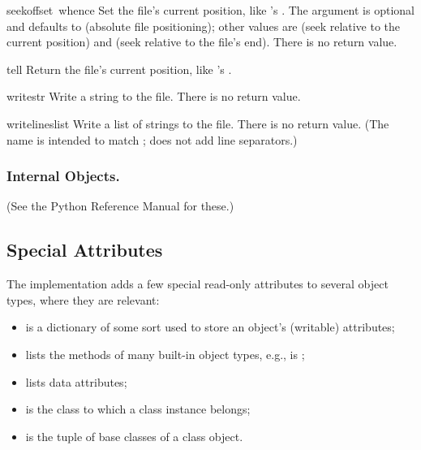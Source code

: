 \begin{funcdesc}{seek}{offset\, whence}
  Set the file's current position, like 's .
  The  argument is optional and defaults to 
  (absolute file positioning); other values are  (seek
  relative to the current position) and  (seek relative to the
  file's end).  There is no return value.
\end{funcdesc}

\begin{funcdesc}{tell}{}
  Return the file's current position, like 's .
\end{funcdesc}

\begin{funcdesc}{write}{str}
  Write a string to the file.  There is no return value.
\end{funcdesc}

\begin{funcdesc}{writelines}{list}
Write a list of strings to the file.  There is no return value.
(The name is intended to match ; 
does not add line separators.)
\end{funcdesc}

\subsubsection{Internal Objects.}

(See the Python Reference Manual for these.)

\subsection{Special Attributes}

The implementation adds a few special read-only attributes to several
object types, where they are relevant:

\begin{itemize}

\item
{} is a dictionary of some sort used to store an
object's (writable) attributes;

\item
{} lists the methods of many built-in object types,
e.g.,  is
;

\item
{} lists data attributes;

\item
{} is the class to which a class instance belongs;

\item
{} is the tuple of base classes of a class object.

\end{itemize}
